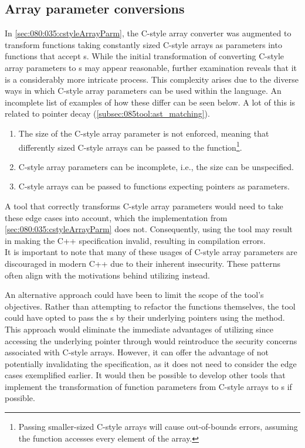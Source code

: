 \subsection{Array parameter conversions}\label{subsec:095disc:arrayParm}
In \cref{sec:080:035:cstyleArrayParm}, the C-style array converter was augmented to transform functions taking constantly sized C-style arrays as parameters into functions that accept s.
While the initial transformation of converting C-style array parameters to s may appear reasonable, further examination reveals that it is a considerably more intricate process.
This complexity arises due to the diverse ways in which C-style array parameters can be used within the language.
An incomplete list of examples of how these differ can be seen below. A lot of this is related to pointer decay (\cref{subsec:085tool:ast_matching}).
\vspace*{-0.75em}
\begin{enumerate}
    \item The size of the C-style array parameter is not enforced, meaning that differently sized C-style arrays can be passed to the function\footnote{
        Passing smaller-sized C-style arrays will cause out-of-bounds errors, assuming the function accesses every element of the array.
    }.
    \item C-style array parameters can be incomplete, i.e., the size can be unspecified.
    \item C-style arrays can be passed to functions expecting pointers as parameters.
\end{enumerate}
\vspace*{-0.75em}
A tool that correctly transforms C-style array parameters would need to take these edge cases into account, which the implementation from \cref{sec:080:035:cstyleArrayParm} does not.
Consequently, using the tool may result in making the C++ specification invalid, resulting in compilation errors.\\
It is important to note that many of these usages of C-style array parameters are discouraged in modern C++ due to their inherent insecurity. These patterns often align with the motivations behind utilizing  instead.

An alternative approach could have been to limit the scope of the tool's objectives.
Rather than attempting to refactor the functions themselves, the tool could have opted to pass the s by their underlying pointers using the  method.
This approach would eliminate the immediate advantages of utilizing  since accessing the underlying pointer through  would reintroduce the security concerns associated with C-style arrays.
However, it can offer the advantage of not potentially invalidating the specification, as it does not need to consider the edge cases exemplified earlier.
It would then be possible to develop other tools that implement the transformation of function parameters from C-style arrays to s if possible.


